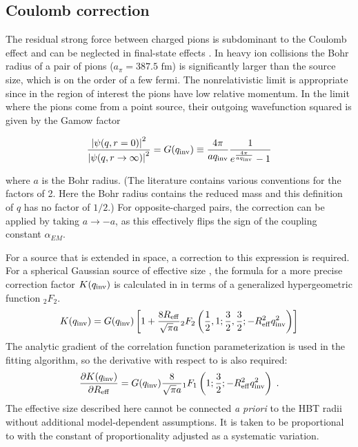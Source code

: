 
\subsection{Coulomb correction}
\label{subsec:coulomb}
The residual strong force between charged pions is subdominant to the Coulomb effect and can be neglected in final-state effects \cite{Lednicky:2005tb}.
In heavy ion collisions the Bohr radius of a pair of pions ($a_{\pi} = 387.5 \textrm{ fm}$) is significantly larger than the source size, which is on the order of a few fermi.
The nonrelativistic limit is appropriate since in the region of interest the pions have low relative momentum.
In the limit where the pions come from a point source, their outgoing wavefunction squared is given by the Gamow factor

\begin{equation} \frac{\left| \psi (q, r=0) \right|^2}{\left| \psi (q, r\rightarrow\infty) \right|^2} = G(q_{\mathrm{inv}}) \equiv \frac{4\pi}{a q_{\mathrm{inv}}}\frac{1}{e^{\frac{4\pi}{a q_{\mathrm{inv}}}} - 1} \end{equation}

where $a$ is the Bohr radius.
(The literature contains various conventions for the factors of 2.
Here the Bohr radius contains the reduced mass and this definition of $q$ has no factor of $1/2$.)
For opposite-charged pairs, the correction can be applied by taking $a \to -a$, as this effectively flips the sign of the coupling constant $\alpha_{EM}$.

For a source that is extended in space, a correction to this expression is required.
For a spherical Gaussian source of effective size \Reff, the formula for a more precise correction factor $K(q_{\mathrm{inv}})$ is calculated in  in terms of a generalized hypergeometric function ${}_2 F_2$.
\begin{equation} K(q_{\mathrm{inv}}) = G(q_{\mathrm{inv}}) \left[ 1 + \frac{8R_{\mathrm{eff}}}{\sqrt{\pi}a} {}_2 F_2 \left( \frac{1}{2}, 1; \frac{3}{2}, \frac{3}{2}; -R_{\mathrm{eff}}^2 q_{\mathrm{inv}}^2 \right) \right] \end{equation}
The analytic gradient of the correlation function parameterization is used in the fitting algorithm, so the derivative with respect to \Reff is also required:
\begin{equation}
  \frac{\partial K(q_{\mathrm{inv}})}{\partial R_{\mathrm{eff}}} = G(q_{\mathrm{inv}}) \frac{8}{\sqrt{\pi}a} {}_1 F_1 \left( 1; \frac{3}{2}; -R_{\mathrm{eff}}^2 q_{\mathrm{inv}}^2 \right) \; .
\end{equation}
The effective size \Reff described here cannot be connected \emph{a priori} to the HBT radii without additional model-dependent assumptions.
It is taken to be proportional to \Rinv with the constant of proportionality adjusted as a systematic variation.

